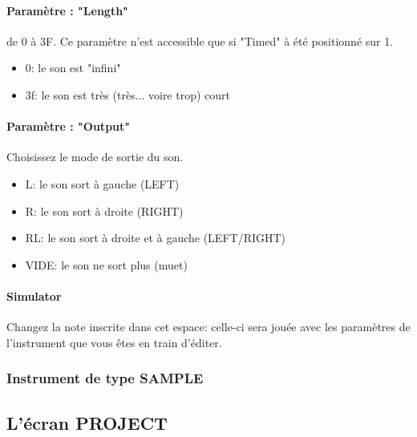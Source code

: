 \documentclass[12pt,a4paper]{article}
\begin{document}
        \paragraph{Paramètre : "Length"} de 0 à 3F. Ce paramètre n'est accessible que si "Timed" à été positionné sur 1.
            \begin{itemize}
                \item{0: le son est "infini"}
                \item{3f: le son est très (très... voire trop) court}
            \end{itemize}
        
        \paragraph{Paramètre : "Output"} Choisissez le mode de sortie du son.
            \begin{itemize}
                \item{L: le son sort à gauche (LEFT)}
                \item{R: le son sort à droite (RIGHT)}
                \item{RL: le son sort à droite et à gauche (LEFT/RIGHT)}
                \item{VIDE: le son ne sort plus (muet)}
            \end{itemize}
        
        \paragraph{Simulator} Changez la note inscrite dans cet espace: celle-ci sera jouée avec les paramètres de l'instrument que vous êtes en train d'éditer.
        
        \subsubsection{Instrument de type SAMPLE}
        
        
    
    \subsection{L'écran PROJECT}
    
\end{document}
